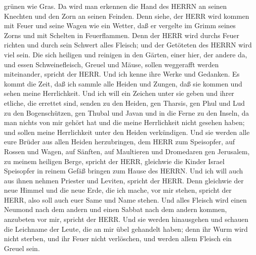 grünen wie Gras. Da wird man erkennen die Hand des HERRN an seinen
Knechten und den Zorn an seinen Feinden.  Denn siehe, der
HERR wird kommen mit Feuer und seine Wagen wie ein Wetter, daß er
vergelte im Grimm seines Zorns und mit Schelten in Feuerflammen.
 Denn der HERR wird durchs Feuer richten und durch sein
Schwert alles Fleisch; und der Getöteten des HERRN wird viel sein.
 Die sich heiligen und reinigen in den Gärten, einer hier,
der andere da, und essen Schweinefleisch, Greuel und Mäuse, sollen
weggerafft werden miteinander, spricht der HERR.  Und ich
kenne ihre Werke und Gedanken. Es kommt die Zeit, daß ich sammle alle
Heiden und Zungen, daß sie kommen und sehen meine Herrlichkeit.
 Und ich will ein Zeichen unter sie geben und ihrer
etliche, die errettet sind, senden zu den Heiden, gen Tharsis, gen Phul
und Lud zu den Bogenschützen, gen Thubal und Javan und in die Ferne zu
den Inseln, da man nichts von mir gehört hat und die meine Herrlichkeit
nicht gesehen haben; und sollen meine Herrlichkeit unter den Heiden
verkündigen.  Und sie werden alle eure Brüder aus allen
Heiden herzubringen, dem HERR zum Speisopfer, auf Rossen und Wagen, auf
Sänften, auf Maultieren und Dromedaren gen Jerusalem, zu meinem heiligen
Berge, spricht der HERR, gleichwie die Kinder Israel Speisopfer in
reinem Gefäß bringen zum Hause des HERRN.  Und ich will
auch aus ihnen nehmen Priester und Leviten, spricht der HERR.
 Denn gleichwie der neue Himmel und die neue Erde, die ich
mache, vor mir stehen, spricht der HERR, also soll auch euer Same und
Name stehen.  Und alles Fleisch wird einen Neumond nach dem
andern und einen Sabbat nach dem andern kommen, anzubeten vor mir,
spricht der HERR.  Und sie werden hinausgehen und schauen
die Leichname der Leute, die an mir übel gehandelt haben; denn ihr Wurm
wird nicht sterben, und ihr Feuer nicht verlöschen, und werden allem
Fleisch ein Greuel sein.
